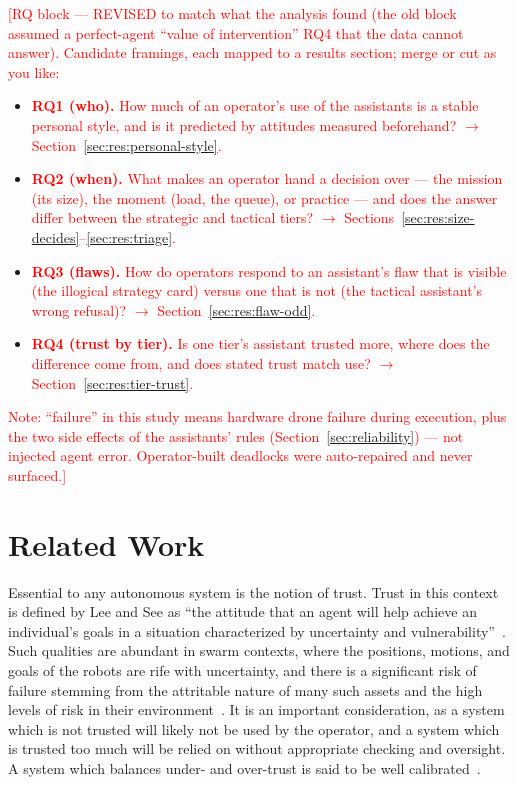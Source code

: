 \documentclass[10pt]{article}
\theoremstyle{definition}
\begin{document}
\textcolor{red}{[RQ block --- REVISED to match what the analysis found (the old block assumed a perfect-agent ``value of intervention'' RQ4 that the data cannot answer). Candidate framings, each mapped to a results section; merge or cut as you like:}
\begin{itemize}
  \item \textcolor{red}{\textbf{RQ1 (who).} How much of an operator's use of the assistants is a stable personal style, and is it predicted by attitudes measured beforehand? $\rightarrow$ Section~\ref{sec:res:personal-style}.}
  \item \textcolor{red}{\textbf{RQ2 (when).} What makes an operator hand a decision over --- the mission (its size), the moment (load, the queue), or practice --- and does the answer differ between the strategic and tactical tiers? $\rightarrow$ Sections~\ref{sec:res:size-decides}--\ref{sec:res:triage}.}
  \item \textcolor{red}{\textbf{RQ3 (flaws).} How do operators respond to an assistant's flaw that is visible (the illogical strategy card) versus one that is not (the tactical assistant's wrong refusal)? $\rightarrow$ Section~\ref{sec:res:flaw-odd}.}
  \item \textcolor{red}{\textbf{RQ4 (trust by tier).} Is one tier's assistant trusted more, where does the difference come from, and does stated trust match use? $\rightarrow$ Section~\ref{sec:res:tier-trust}.}
\end{itemize}
\textcolor{red}{Note: ``failure'' in this study means hardware drone failure during execution, plus the two side effects of the assistants' rules (Section~\ref{sec:reliability}) --- not injected agent error. Operator-built deadlocks were auto-repaired and never surfaced.]}

\section{Related Work}\label{sec:relatedwork}

Essential to any autonomous system is the notion of trust. Trust in this context is defined by Lee and See as ``the attitude that an agent will help achieve an individual's goals in a situation characterized by uncertainty and vulnerability''~\cite{lee2004trust}. Such qualities are abundant in swarm contexts, where the positions, motions, and goals of the robots are rife with uncertainty, and there is a significant risk of failure stemming from the attritable nature of many such assets and the high levels of risk in their environment~\cite{soorati2024enabling}. It is an important consideration, as a system which is not trusted will likely not be used by the operator, and a system which is trusted too much will be relied on without appropriate checking and oversight. A system which balances under- and over-trust is said to be well calibrated~\cite{mcdermott2019practical}.
\end{document}
